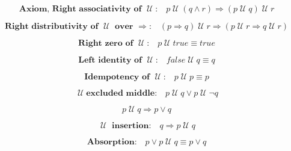 \documentclass[12pt, fleqn, leqno]{article}
\newcommand{\impl}{\ensuremath{\Rightarrow}}        %
\newcommand{\Until}{\;\mathcal{U}\;}
\newcommand{\spacer}{\vspace{-30pt}}
\begin{document}
\spacer

\begin{equation}\label{E:rightAssocUntil}
\textbf{Axiom, Right associativity of $\Until$:}\quad p \Until (q\land r) \impl (p \Until q) \Until r
\end{equation}

\spacer

\begin{equation}\label{E:rightUntilImplDist}
\textbf{Right distributivity of $\Until$ over $\impl$:}\quad (p \impl q) \Until r\impl (p \Until r \impl q \Until r)
\end{equation}

\spacer

\begin{equation}\label{E:zeroUntil}
\textbf{Right zero of $\Until$:}\quad p \Until true \equiv true
\end{equation}

\spacer

\begin{equation}\label{E:leftIdUntil}
\textbf{Left identity of $\Until$:}\quad false \Until q \equiv q
\end{equation}

\spacer

\begin{equation}\label{E:idemUntil}
\textbf{Idempotency of $\Until$:}\quad p \Until p \equiv p
\end{equation}

\spacer

\begin{equation}\label{E:untilExcludedMiddle}
\Until \textbf{excluded middle:}\quad p \Until q \lor p\Until \neg q
\end{equation}

\spacer

\begin{equation}\label{E:untilImpOr}
p \Until q \impl p \lor q
\end{equation}

\spacer

\begin{equation}\label{E:untilInsertion}
\textbf{$\Until$ insertion:}\quad q \impl p \Until q
\end{equation}

\spacer

\begin{equation}\label{E:untilOrP}
\textbf{Absorption:}\quad p \lor p \Until q \equiv p \lor q
\end{equation}
\end{document}
